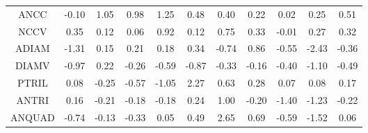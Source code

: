 \begin{longtable}{ | c || c | c | c | c | c | c | c | c | c || c |}
ANCC &  \cellcolor[HTML]{FFFFFF} -0.10 &  \cellcolor[HTML]{E7E7FF} 1.05 &  \cellcolor[HTML]{E7E7FF} 0.98 &  \cellcolor[HTML]{DFDFFF} 1.25 &  \cellcolor[HTML]{EFEFFF} 0.48 &  \cellcolor[HTML]{F7F7FF} 0.40 &  \cellcolor[HTML]{F7F7FF} 0.22 &  \cellcolor[HTML]{FFFFFF} 0.02 &  \cellcolor[HTML]{F7F7FF} 0.25 &  \cellcolor[HTML]{EFEFFF} 0.51 \\
NCCV &  \cellcolor[HTML]{F7F7FF} 0.35 &  \cellcolor[HTML]{FFFFFF} 0.12 &  \cellcolor[HTML]{FFFFFF} 0.06 &  \cellcolor[HTML]{E7E7FF} 0.92 &  \cellcolor[HTML]{FFFFFF} 0.12 &  \cellcolor[HTML]{EFEFFF} 0.75 &  \cellcolor[HTML]{F7F7FF} 0.33 &  \cellcolor[HTML]{FFFFFF} -0.01 &  \cellcolor[HTML]{F7F7FF} 0.27 &  \cellcolor[HTML]{F7F7FF} 0.32 \\
ADIAM &  \cellcolor[HTML]{FFDFDF} -1.31 &  \cellcolor[HTML]{FFFFFF} 0.15 &  \cellcolor[HTML]{F7F7FF} 0.21 &  \cellcolor[HTML]{F7F7FF} 0.18 &  \cellcolor[HTML]{F7F7FF} 0.34 &  \cellcolor[HTML]{FFEFEF} -0.74 &  \cellcolor[HTML]{E7E7FF} 0.86 &  \cellcolor[HTML]{FFEFEF} -0.55 &  \cellcolor[HTML]{FFBFBF} -2.43 &  \cellcolor[HTML]{FFF7F7} -0.36 \\
DIAMV &  \cellcolor[HTML]{FFE7E7} -0.97 &  \cellcolor[HTML]{F7F7FF} 0.22 &  \cellcolor[HTML]{FFF7F7} -0.26 &  \cellcolor[HTML]{FFEFEF} -0.59 &  \cellcolor[HTML]{FFE7E7} -0.87 &  \cellcolor[HTML]{FFF7F7} -0.33 &  \cellcolor[HTML]{FFF7F7} -0.16 &  \cellcolor[HTML]{FFF7F7} -0.40 &  \cellcolor[HTML]{FFE7E7} -1.10 &  \cellcolor[HTML]{FFEFEF} -0.49 \\
PTRIL &  \cellcolor[HTML]{FFFFFF} 0.08 &  \cellcolor[HTML]{FFF7F7} -0.25 &  \cellcolor[HTML]{FFEFEF} -0.57 &  \cellcolor[HTML]{FFE7E7} -1.05 &  \cellcolor[HTML]{C7C7FF} 2.27 &  \cellcolor[HTML]{EFEFFF} 0.63 &  \cellcolor[HTML]{F7F7FF} 0.28 &  \cellcolor[HTML]{FFFFFF} 0.07 &  \cellcolor[HTML]{FFFFFF} 0.08 &  \cellcolor[HTML]{F7F7FF} 0.17 \\
ANTRI &  \cellcolor[HTML]{F7F7FF} 0.16 &  \cellcolor[HTML]{FFF7F7} -0.21 &  \cellcolor[HTML]{FFF7F7} -0.18 &  \cellcolor[HTML]{FFF7F7} -0.18 &  \cellcolor[HTML]{F7F7FF} 0.24 &  \cellcolor[HTML]{E7E7FF} 1.00 &  \cellcolor[HTML]{FFF7F7} -0.20 &  \cellcolor[HTML]{FFDFDF} -1.40 &  \cellcolor[HTML]{FFDFDF} -1.23 &  \cellcolor[HTML]{FFF7F7} -0.22 \\
ANQUAD &  \cellcolor[HTML]{FFEFEF} -0.74 &  \cellcolor[HTML]{FFFFFF} -0.13 &  \cellcolor[HTML]{FFF7F7} -0.33 &  \cellcolor[HTML]{FFFFFF} 0.05 &  \cellcolor[HTML]{EFEFFF} 0.49 &  \cellcolor[HTML]{BFBFFF} 2.65 &  \cellcolor[HTML]{EFEFFF} 0.69 &  \cellcolor[HTML]{FFEFEF} -0.59 &  \cellcolor[HTML]{FFD7D7} -1.52 &  \cellcolor[HTML]{FFFFFF} 0.06 \\

\end{longtable}
